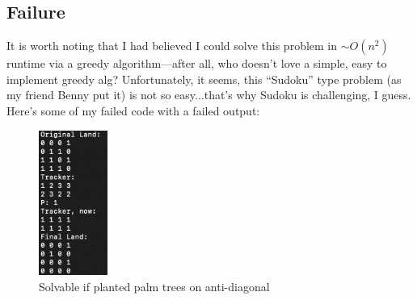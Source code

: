 \documentclass[conference]{styles/acmsiggraph}
\newcommand{\?}{\stackrel{?}{=}}
\begin{document}
\newpage
\subsection{Failure}
It is worth noting that I had believed I could solve this problem in $\sim O(n^2)$ runtime via a greedy algorithm---after all, who doesn't love a simple, easy to implement greedy alg?  Unfortunately, it seems, this \enquote{Sudoku} type problem (as my friend Benny put it) is not so easy...that's why Sudoku is challenging, I guess.  Here's some of my failed code with a failed output:

\begin{figure}[h!]
    \centering
    \includegraphics[width=0.2\textwidth]{P3 Figs/Q3_greedyFails.png}
    \caption{Solvable if planted palm trees on anti-diagonal}
    \label{fig:greedyFails}
\end{figure}
\FloatBarrier
\end{document}

